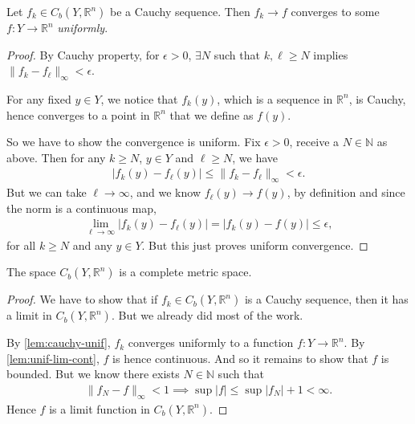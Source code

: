 \begin{lemma}\label{lem:cauchy-unif}
    Let $f_{k} \in C_{b}(Y, \mathbb{R}^{n})$ be a Cauchy sequence. Then $f_{k} \to f$ converges to some $f: Y \to \mathbb{R}^{n}$ \textit{uniformly}.
\end{lemma}
\begin{proof}
    By Cauchy property, for $\epsilon > 0$, $\exists N$ such that $k, \ell \geq N$ implies $\lVert f_{k} - f_{\ell} \rVert_{\infty} < \epsilon$.

    For any fixed $y \in Y$, we notice that $f_{k}(y)$, which is a sequence in $\mathbb{R}^{n}$, is Cauchy, hence converges to a point in $\mathbb{R}^{n}$ that we define as $f(y)$. 

    So we have to show the convergence is uniform. Fix $\epsilon > 0$, receive a $N \in \mathbb{N}$ as above. Then for any $k \geq N$, $y \in Y$ and $\ell \geq N$, we have
    \begin{align*}
        \left| f_{k}(y) - f_{\ell}(y) \right| \leq \lVert f_{k} - f_{\ell} \rVert_{\infty} < \epsilon.
    \end{align*}
    But we can take $\ell \to \infty$, and we know $f_{\ell}(y) \to f(y)$, by definition and since the norm is a continuous map, 
    \begin{align*}
        \lim_{\ell \to \infty} \left| f_{k}(y) - f_{\ell}(y) \right| = \left| f_{k}(y) - f(y) \right| \leq \epsilon,
    \end{align*}
    for all $k \geq N$ and any $y \in Y$. But this just proves uniform convergence. 
\end{proof}

\begin{prop}\label{prop:cb-comp}
    The space $C_{b}(Y, \mathbb{R}^{n})$ is a complete metric space.
\end{prop}
\begin{proof}
    We have to show that if $f_{k} \in C_{b}(Y, \mathbb{R}^{n})$ is a Cauchy sequence, then it has a limit in $C_{b}(Y, \mathbb{R}^{n})$. But we already did most of the work.

    By \ref{lem:cauchy-unif}, $f_{k}$ converges uniformly to a function $f: Y \to \mathbb{R}^{n}$. By \ref{lem:unif-lim-cont}, $f$ is hence continuous. And so it remains to show that $f$ is bounded. But we know there exists $N \in \mathbb{N}$ such that 
    \begin{align*}
        \lVert f_{N} - f \rVert_{\infty} < 1 \implies \sup \left| f \right| \leq \sup \left| f_{N} \right| + 1 < \infty.
    \end{align*}
    Hence $f$ is a limit function in $C_{b}(Y, \mathbb{R}^{n})$. 
\end{proof}

